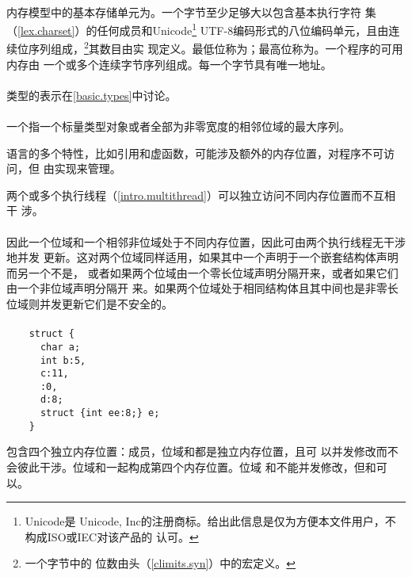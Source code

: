 \paragraph{} %
\cpp{}内存模型中的基本存储单元为。一个字节至少足够大以包含基本执行字符
集（\ref{lex.charset}）的任何成员和Unicode\footnote{Unicode\textregistered{}是
Unicode, Inc的注册商标。给出此信息是仅为方便本文件用户，不构成ISO或IEC对该产品的
认可。} UTF-8编码形式的八位编码单元，且由连续位序列组成，\footnote{一个字节中的
位数由头（\ref{climits.syn}）中的宏定义。}其数目由实
现定义。最低位称为；最高位称为。一个\cpp{}程序的可用内存由
一个或多个连续字节序列组成。每一个字节具有唯一地址。

\paragraph{} %
\begin{note}
  类型的表示在\ref{basic.types}中讨论。
\end{note}

\paragraph{} %
 一个指一个标量类型对象或者全部为非零宽度的相邻位域的最大序列。

 \begin{note}
   语言的多个特性，比如引用和虚函数，可能涉及额外的内存位置，对程序不可访问，但
   由实现来管理。
 \end{note}

 两个或多个执行线程（\ref{intro.multithread}）可以独立访问不同内存位置而不互相干
 涉。

\paragraph{} %
\begin{note}
  因此一个位域和一个相邻非位域处于不同内存位置，因此可由两个执行线程无干涉地并发
  更新。这对两个位域同样适用，如果其中一个声明于一个嵌套结构体声明而另一个不是，
  或者如果两个位域由一个零长位域声明分隔开来，或者如果它们由一个非位域声明分隔开
  来。如果两个位域处于相同结构体且其中间也是非零长位域则并发更新它们是不安全的。
\end{note}

\paragraph{} %
\begin{example}
  \begin{lstlisting}
    struct {
      char a;
      int b:5,
      c:11,
      :0,
      d:8;
      struct {int ee:8;} e;
    }
  \end{lstlisting}
  包含四个独立内存位置：成员，位域和都是独立内存位置，且可
  以并发修改而不会彼此干涉。位域和一起构成第四个内存位置。位域
  和不能并发修改，但和可以。
\end{example}
